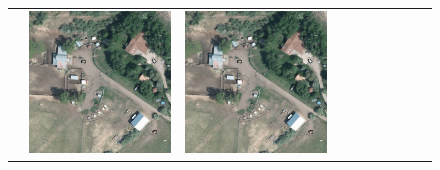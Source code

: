 \begin{figure}[h!]
\begin{tabularx}{\textwidth}{c|*{9}{X}}
    & \includegraphics[trim={730pt 220pt 200pt 720pt},clip,width=\linewidth]{images/015Results/01abb_vs_obb/comp_images/ground_truth_obb/523.png}
    & \includegraphics[trim={850pt 110pt 80pt 830pt},clip,width=\linewidth]{images/015Results/01abb_vs_obb/comp_images/ground_truth_obb/523.png}

\end{tabularx}
\end{figure}
